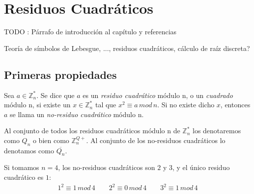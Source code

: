 \chapter{Residuos Cuadráticos}\label{ch:qr} 

TODO : Párrafo de introducción al capítulo y referencias


Teoría de símbolos de Lebesgue, ..., residuos cuadráticos, cálculo de raíz discreta?





\section{Primeras propiedades}

\begin{definition}
	Sea $a\in \mathbb{Z}^*_n$. Se dice que $a$ es un \textit{residuo cuadrático} módulo n, o un \textit{cuadrado} módulo n, si existe un $x \in \mathbb{Z}^*_n$ tal que $x^2 \equiv a \, mod \, n$.
	Si no existe dicho $x$, entonces $a$ se llama un \textit{no-residuo cuadrático} módulo n.
	
	Al conjunto de todos los residuos cuadráticos módulo n de $\mathbb{Z}^*_n$ los denotaremos como $Q_n$ o bien como $\mathbb{Z}^{Q+}_n$.
	Al conjunto de los no-residuos cuadráticos lo denotamos como $\overline{Q_n}$.
\end{definition}

\begin{example}
	Si tomamos $n=4$, los no-residuos cuadráticos son $2$ y $3$, y el único residuo cuadrático es $1$:
	\begin{align*}
		1^2 \equiv 1 \, mod \, 4 \qquad 2^2 \equiv 0 \, mod \, 4 \qquad  3^2 \equiv 1 \, mod \, 4 
	\end{align*}
	
\end{example}


